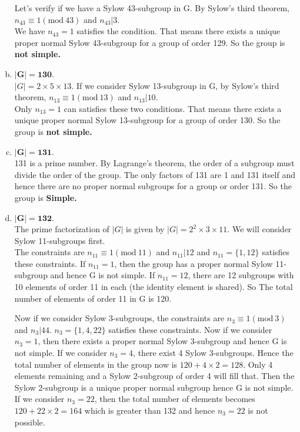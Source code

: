 \documentclass[11pt,a4paper]{article}
\begin{document}
\begin{flushleft}
\begin{enumerate}[(a)]
			Let's verify if we have a Sylow 43-subgroup in G. By Sylow's third theorem, $n_{43} \equiv 1(\textrm{mod}\ 43)$ and $n_{43}|3$.\\
			We have $n_{43} = 1$ satisfies the condition. That means there exists a unique proper normal Sylow 43-subgroup for a group of order 129. So the group is \textbf{not simple.}
			
			\item $\mathbf{|G| = 130}$.\medskip\\
			
			$|G| = 2\times5\times13$. If we consider Sylow 13-subgroup in G, by Sylow's third theorem, $n_{13} \equiv 1(\textrm{mod}\ 13)$ and $n_{13}|10$.\\
			Only $n_{13} = 1$ can satisfies these two conditions. That means there exists a unique proper normal Sylow 13-subgroup for a group of order 130. So the group is \textbf{not simple.}
			
			\item $\mathbf{|G| = 131}$.\\
			131 is a prime number. By Lagrange's theorem, the order of a subgroup must divide the order of the group. The only factors of 131 are 1 and 131 itself and hence there are no proper normal subgroups for a group or order 131. So the group is \textbf{Simple.}
			
			\item $\mathbf{|G| = 132}$.\\
			
			The prime factorization of $|G|$ is given by $|G| = 2^2\times3\times11$. We will consider Sylow 11-subgroups first.\\
			The constraints are $n_{11} \equiv 1(\textrm{mod}\ 11)$ and $n_{11}|12$ and $n_{11} = \{1, 12\}$ satisfies these constraints. If $n_{11} = 1$, then the group has a proper normal Sylow 11-subgroup and hence G is not simple. If $n_{11} = 12$, there are 12 subgroups with 10 elements of order 11 in each (the identity element is shared). So The total number of elements of order 11 in G is 120.
			
			Now if we consider Sylow 3-subgroups, the constraints are $n_3 \equiv 1(\textrm{mod}\ 3)$ and $n_3|44$. $n_3 = \{1, 4, 22\}$ satisfies these constraints. Now if we consider $n_3 = 1$, then there exists a proper normal Sylow 3-subgroup and hence G is not simple. If we consider $n_3 = 4$, there exist 4 Sylow 3-subgroups. Hence the total number of elements in the group now is $120 + 4\times2 = 128$. Only 4 elements remaining and a Sylow 2-subgroup of order 4 will fill that. Then the Sylow 2-subgroup is a unique proper normal subgroup hence G is not simple. If we consider $n_3 = 22$, then the total number of elements becomes $120 + 22\times2 = 164$ which is greater than 132 and hence $n_3 = 22$ is not possible.
			

\end{enumerate}
\end{flushleft}
\end{document}
